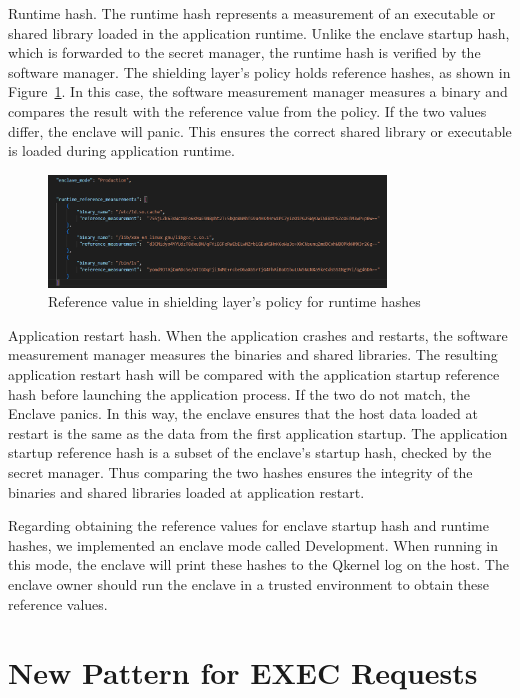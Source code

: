Runtime hash. The runtime hash represents a measurement of an executable or shared library loaded in the application runtime. Unlike the enclave startup hash, which is forwarded to the secret manager, the runtime hash is verified by the software manager. The shielding layer's policy holds reference hashes, as shown in Figure~\ref{fig:measurement}. In this case, 
the software measurement manager measures a binary and compares the result with the reference value from the policy. If the two values differ, the enclave will panic. This ensures the correct shared library or executable is loaded during application runtime.
\begin{figure}[!htb]
    \centering
    \includegraphics[width=0.8\textwidth]{images/measurement.png}
    \caption[Reference value in shielding layer's policy for runtime hashes]{Reference value in shielding layer's policy for runtime hashes}
    \label{fig:measurement}
\end{figure}

Application restart hash. When the application crashes and restarts, the software measurement manager measures the binaries and shared libraries. The resulting application restart hash will be compared with the application startup reference hash before launching the application process. If the two do not match, the Enclave panics. In this way, the enclave 
ensures that the host data loaded at restart is the same as the data from the first application startup. The application startup reference hash is a subset of the enclave's startup hash, checked by the secret manager. Thus comparing the two hashes ensures the integrity of the binaries and shared libraries loaded at application restart. 

Regarding obtaining the reference values for enclave startup hash and runtime hashes, we implemented an enclave mode called Development. When running in this mode, the enclave will print these hashes to the Qkernel log on the host. The enclave owner should run the enclave in a trusted environment to obtain these reference values.

\section{New Pattern for EXEC Requests}
\label{sec:design_EXEC_Requests}
